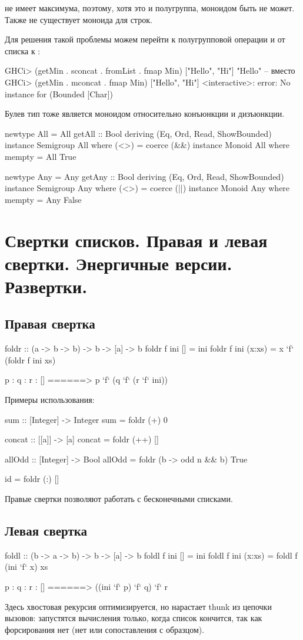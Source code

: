 \documentclass[11pt,a4paper]{article}
\begin{document}
 не имеет максимума, поэтому, хотя это и полугруппа, моноидом быть не может. Также не существует моноида для строк.

Для решения такой проблемы можем перейти к полугрупповой операции  и от списка к  :
\begin{hscode}
GHCi> (getMin . sconcat . fromList . fmap Min) ["Hello", "Hi"]
"Hello"
-- вместо
GHCi> (getMin . mconcat . fmap Min) ["Hello", "Hi"]
<interactive>: error: No instance for (Bounded [Char])
\end{hscode}

Булев тип тоже является моноидом относительно конъюнкции и дизъюнкции.
\begin{hscode}
newtype All = All { getAll :: Bool} deriving (Eq, Ord, Read, ShowBounded)
instance Semigroup All where
  (<>) = coerce (&&)
instance Monoid All where
  mempty = All True

newtype Any = Any { getAny :: Bool} deriving (Eq, Ord, Read, ShowBounded)
instance Semigroup Any where
  (<>) = coerce (||)
instance Monoid Any where
  mempty = Any False
\end{hscode}


\section{Свертки списков. Правая и левая свертки. Энергичные версии. Развертки.}
\subsection{Правая свертка}
\begin{hscode}
foldr :: (a -> b -> b) -> b -> [a] -> b
foldr f ini [] = ini
foldr f ini (x:xs) = x `f` (foldr f ini xs)

p : q : r : []  ======>  p `f` (q `f` (r `f` ini))
\end{hscode}
Примеры  использования:
\begin{hscode}
sum :: [Integer] -> Integer
sum = foldr (+) 0

concat :: [[a]] -> [a]
concat = foldr (++) []

allOdd :: [Integer] -> Bool
allOdd = foldr (\n b -> odd n && b) True

id = foldr (:) []
\end{hscode}
Правые свертки позволяют работать с бесконечными списками.
\subsection{Левая свертка}
\begin{hscode}
foldl :: (b -> a -> b) -> b -> [a] -> b
foldl f ini [] = ini
foldl f ini (x:xs) = foldl f (ini `f` x) xs

p : q : r : []  ======>  ((ini `f` p) `f` q) `f` r
\end{hscode}
Здесь хвостовая рекурсия оптимизируется, но нарастает thunk из цепочки вызовов: запустятся вычисления только, когда список кончится, так как форсирования нет (нет  или сопоставления с образцом).
\end{document}
